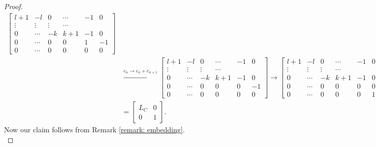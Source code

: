 \documentclass[11pt,reqno]{amsart}
\theoremstyle{definition}
\theoremstyle{plain}
\begin{document}
\begin{proof}
\begin{align*}
\begin{bmatrix}
				l + 1 & -l & 0 & \cdots & -1 & 0 \\
				\vdots & \vdots & \vdots & \cdots \\
				0 & \cdots & -k & k+1 & -1 &0 \\
				0 & \cdots & 0 & 0 & 1 & -1 \\
				0 & \cdots & 0 & 0 & 0 & 0 
			\end{bmatrix} \\
			&\stackrel{c_{n} \to c_{n} + c_{n+1}}\longrightarrow
			\begin{bmatrix} 
				l + 1 & -l & 0 & \cdots & -1 & 0 \\
				\vdots & \vdots & \vdots & \cdots \\
				0 & \cdots & -k & k+1 & -1 &0 \\
				0 & \cdots & 0 & 0 & 0 & -1 \\
				0 & \cdots & 0 & 0 & 0 & 0 
			\end{bmatrix}
			\longrightarrow
			\begin{bmatrix} 
				l + 1 & -l & 0 & \cdots & -1 & 0 \\
				\vdots & \vdots & \vdots & \cdots \\
				0 & \cdots & -k & k+1 & -1 &0 \\
				0 & \cdots & 0 & 0 & 0 & 0 \\
				0 & \cdots & 0 & 0 & 0 & 1 
			\end{bmatrix}\\
			&=
			\left[ \begin{array}{c|c}
				L_C & 0 \\
				\hline
				0 & 1
			\end{array} \right].
			\end{align*}
Now our claim follows from Remark \ref{remark: embedding}. \\


\end{proof}
\end{document}
